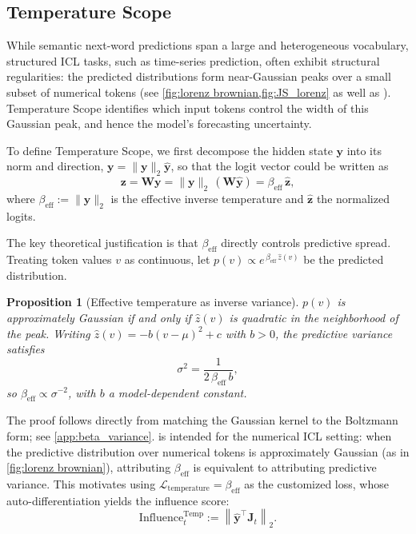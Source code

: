 \documentclass{article}
\newtheorem{proposition}{Proposition}
\begin{document}
\subsection{Temperature Scope}
\label{sec:Temperature Scope}

While semantic next-word predictions span a large and heterogeneous vocabulary, 
structured ICL tasks, such as time-series prediction, \cite{gruver2024largelanguagemodelszeroshot} often exhibit structural regularities: 
the predicted distributions form near-Gaussian peaks over a small subset of numerical tokens (see \cref{fig:lorenz brownian,fig:JS_lorenz} as well as \cite{liu2025density}).
Temperature Scope identifies which input tokens control the width of this Gaussian peak, and hence the model's forecasting uncertainty.

To define Temperature Scope, we first decompose the hidden state $\bm{y}$ into its norm and direction, $\bm{y} = \|\bm{y}\|_2 \hat{\bm{y}}$, 
so that the logit vector could be written as 
\[
  \bm{z} = \bm{W}\bm{y} = \|\bm{y}\|_2\,(\bm{W}\hat{\bm{y}}) = \beta_\mathrm{eff}\,\hat{\bm{z}},
\]
where $\beta_\mathrm{eff} := \|\bm{y}\|_2$ is the effective inverse temperature and $\hat{\bm{z}}$ the normalized logits.

The key theoretical justification is that $\beta_\mathrm{eff}$ directly controls predictive spread.
Treating token values $v$ as continuous, let $p(v) \propto e^{\,\beta_\mathrm{eff}\,\hat{z}(v)}$ be the predicted distribution.

\begin{proposition}[Effective temperature as inverse variance]
\label{prop:beta_variance}
$p(v)$ is approximately Gaussian if and only if $\hat{z}(v)$ is quadratic in the neighborhood of the peak.
Writing $\hat{z}(v) = -b(v-\mu)^2 + c$ with $b>0$, the predictive variance satisfies
\begin{equation}
    \sigma^2 = \frac{1}{2\,\beta_\mathrm{eff}\, b},
    \label{eq:beta_variance}
\end{equation}
so $\beta_\mathrm{eff} \propto \sigma^{-2}$, with $b$ a model-dependent constant.
\end{proposition}

The proof follows directly from matching the Gaussian kernel to the Boltzmann form; see \cref{app:beta_variance}.
 is intended for the numerical ICL setting: when the predictive distribution over numerical tokens is approximately Gaussian (as in \cref{fig:lorenz brownian}), attributing $\beta_\mathrm{eff}$ is equivalent to attributing predictive variance.
This motivates using $\mathcal{L}_\mathrm{temperature} = \beta_\mathrm{eff}$ as the customized loss, whose auto-differentiation yields the influence score:
\begin{equation}
  \mathrm{Influence}_t^{\mathrm{Temp}} :=\left\| \hat{\bm{y}}^\intercal \bm{J}_t \right\|_2.
  \label{eq:temp_influence}
\end{equation}
\end{document}
